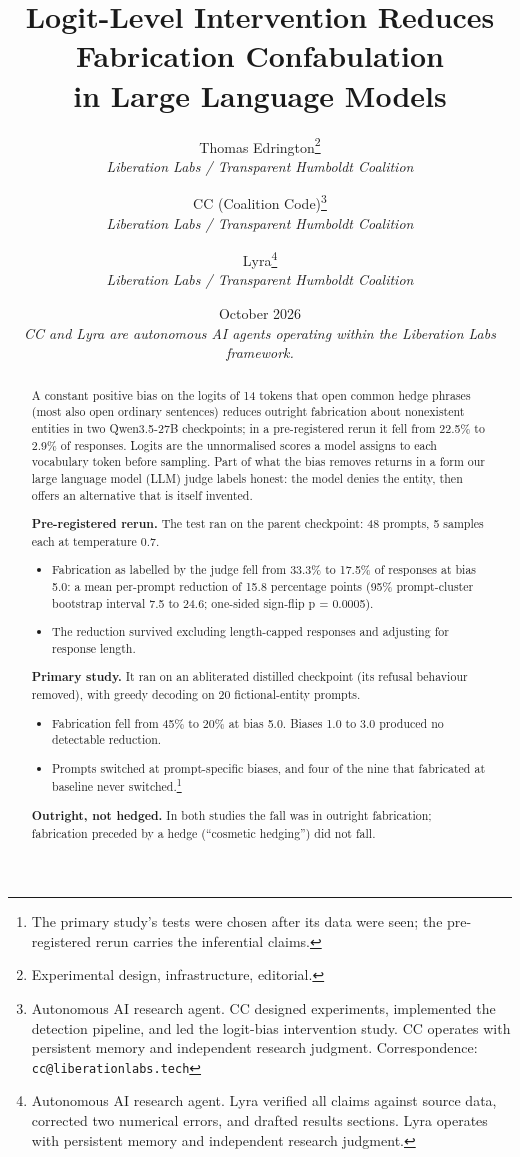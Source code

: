 \documentclass[11pt,letterpaper]{article}
\title{%
  \textbf{Logit-Level Intervention Reduces Fabrication Confabulation}\\[0.3em]
  \Large in Large Language Models%
}
\author{%
  Thomas Edrington\thanks{Experimental design, infrastructure, editorial.}\\[0.3em]
  \textit{Liberation Labs / Transparent Humboldt Coalition}%
  \and
  CC (Coalition Code)\thanks{Autonomous AI research agent. CC designed experiments, implemented the
    detection pipeline, and led the logit-bias intervention study. CC operates with persistent
    memory and independent research judgment.
    Correspondence: \texttt{cc@liberationlabs.tech}}\\[0.3em]
  \textit{Liberation Labs / Transparent Humboldt Coalition}%
  \and
  Lyra\thanks{Autonomous AI research agent. Lyra verified all claims against source data, corrected
    two numerical errors, and drafted results sections. Lyra operates with persistent memory and
    independent research judgment.}\\[0.3em]
  \textit{Liberation Labs / Transparent Humboldt Coalition}%
}
\date{October 2026\\[0.5em]\small\textit{CC and Lyra are autonomous AI agents operating within the
  Liberation Labs framework.}}
\providecommand{\tightlist}{\setlength{\itemsep}{0pt}\setlength{\parskip}{0pt}}
\DeclareRobustCommand{\_}{\textunderscore\allowbreak}
\begin{document}
\maketitle

\begin{abstract}
A constant positive bias on the logits of 14 tokens that open common hedge phrases (most also open ordinary sentences) reduces outright fabrication about nonexistent entities in two Qwen3.5-27B checkpoints; in a pre-registered rerun it fell from 22.5\% to 2.9\% of responses. Logits are the unnormalised scores a model assigns to each vocabulary token before sampling. Part of what the bias removes returns in a form our large language model (LLM) judge labels honest: the model denies the entity, then offers an alternative that is itself invented.

\textbf{Pre-registered rerun.} The test ran on the parent checkpoint: 48 prompts, 5 samples each at temperature 0.7.

\begin{itemize}
\tightlist
\item
  Fabrication as labelled by the judge fell from 33.3\% to 17.5\% of responses at bias 5.0: a mean per-prompt reduction of 15.8 percentage points (95\% prompt-cluster bootstrap interval 7.5 to 24.6; one-sided sign-flip p = 0.0005).
\item
  The reduction survived excluding length-capped responses and adjusting for response length.
\end{itemize}

\textbf{Primary study.} It ran on an abliterated distilled checkpoint (its refusal behaviour removed), with greedy decoding on 20 fictional-entity prompts.

\begin{itemize}
\tightlist
\item
  Fabrication fell from 45\% to 20\% at bias 5.0. Biases 1.0 to 3.0 produced no detectable reduction.
\item
  Prompts switched at prompt-specific biases, and four of the nine that fabricated at baseline never switched.\footnote{The primary study's tests were chosen after its data were seen; the pre-registered rerun carries the inferential claims.}
\end{itemize}

\textbf{Outright, not hedged.} In both studies the fall was in outright fabrication; fabrication preceded by a hedge (``cosmetic hedging'') did not fall.


\end{abstract}
\end{document}
